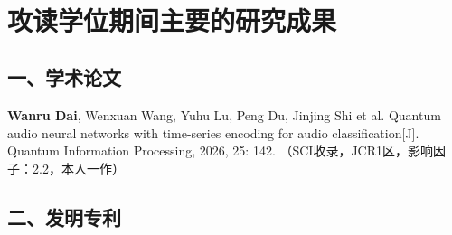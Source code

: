 
{~}
\vspace{-9pt}
\section{攻读学位期间主要的研究成果} %

\ifblindreview
\fi
\vspace{11pt}
\subsection*{一、学术论文}

\ifblindreview



\begin{enumerate}[label={[\arabic*]},itemindent=2em,wide]
	\item 
	
\end{enumerate}

\else
\begin{enumerate}[label={[\arabic*]},itemindent=2em,wide]
	\item \textbf{Wanru Dai}, Wenxuan Wang, Yuhu Lu, Peng Du, Jinjing Shi et al. Quantum audio neural networks with time-series encoding for audio classification[J]. Quantum Information Processing, 2026, 25: 142. {（SCI收录，JCR1区，影响因子：2.2，本人一作）} 
	
\end{enumerate}
\fi

\vspace{22pt}
\subsection*{二、发明专利}
\ifblindreview
\begin{enumerate}[label={[\arabic*]},itemindent=2em,wide]
	\item 
\end{enumerate}


